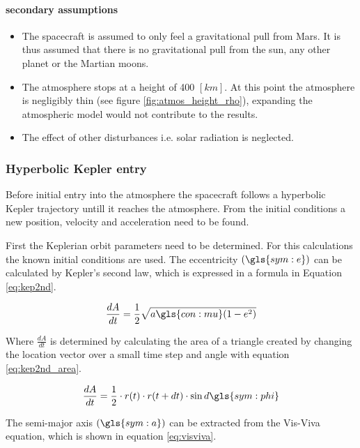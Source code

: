  
 \paragraph{secondary assumptions}
 \begin{itemize}
 \item The spacecraft is assumed to only feel a gravitational pull from Mars. It is thus assumed that there is no gravitational pull from the sun, any other planet or the Martian moons.
 \item The atmosphere stops at a height of 400 $\left[km\right]$. At this point the atmosphere is negligibly thin (see figure \ref{fig:atmos_height_rho}),  expanding the atmospheric model would not contribute to the results.
 \item The effect of other disturbances i.e. solar radiation is neglected.

 \end{itemize}
 
\subsubsection{Hyperbolic Kepler entry}
 \label{sec:hypkep}
Before initial entry into the atmosphere the spacecraft follows a hyperbolic Kepler trajectory untill it reaches the atmosphere. From the initial conditions a new position, velocity and acceleration need to be found. 

First the Keplerian orbit parameters need to be determined. For this calculations the known initial conditions are used. The eccentricity $\left(\gls{sym:e}\right)$ can be calculated by Kepler's second law, which is expressed in a formula in Equation \ref{eq:kep2nd}.

\begin{equation}
\frac{dA}{dt} = \frac{1}{2}\sqrt{a\gls{con:mu}(1-e^2)}
\label{eq:kep2nd}
\end{equation}

Where $\frac{dA}{dt}$ is determined by calculating the area of a triangle created by changing the location vector over a small time step and angle with equation \ref{eq:kep2nd_area}.

\begin{equation}
\frac{dA}{dt} = \frac{1}{2} \cdot r(t) \cdot r(t+dt) \cdot \sin{d\gls{sym:phi}}
\label{eq:kep2nd_area}
\end{equation}

The semi-major axis $\left(\gls{sym:a}\right)$ can be extracted from the Vis-Viva equation, which is shown in equation \ref{eq:visviva}.

